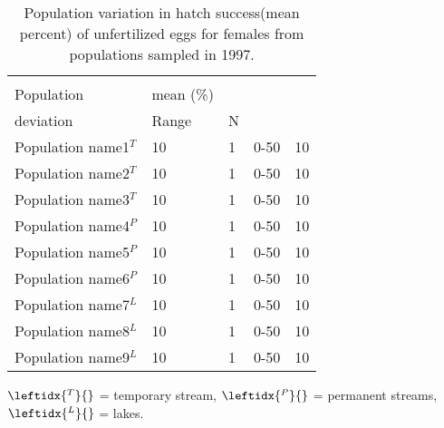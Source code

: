 \documentclass[conference]{IEEEtran}
\begin{document}
\begin{table}[htb]
    \caption{Population variation in hatch success(mean percent) of unfertilized eggs for females from populations sampled in 1997.}
    \begin{tabularx}{\linewidth}{lXXXr}
        \hline  \\[-10pt]
        Population & mean (\%)  &\begin{tabular}[c]{@{}l@{}}Standard\\ deviation\end{tabular}   & Range & N  \\ \hline
        Population name1$^T$ & 10 & 1 & 0-50 & 10 \\ 
        Population name2$^T$ & 10 & 1 & 0-50 & 10 \\ 
        Population name3$^T$ & 10 & 1 & 0-50 & 10 \\ 
        Population name4$^P$ & 10 & 1 & 0-50 & 10 \\ 
        Population name5$^P$ & 10 & 1 & 0-50 & 10  \\ 
        Population name6$^P$ & 10 & 1 & 0-50 & 10 \\ 
        Population name7$^L$ & 10 & 1 & 0-50 & 10 \\ 
        Population name8$^L$ & 10 & 1 & 0-50 & 10 \\ 
        Population name9$^L$ & 10 & 1 & 0-50 & 10 \\ 
        \hline 
    \end{tabularx}
    \begin{tablenotes}
    \item $\leftidx{^T}{}$ = \footnotesize{temporary stream},
    $\leftidx{^P}{}$ = \footnotesize{permanent streams}, 
    $\leftidx{^L}{}$ = \footnotesize{lakes}.
    \item
    \item 
    \end{tablenotes}
\end{table}
\lipsum



\end{document}
